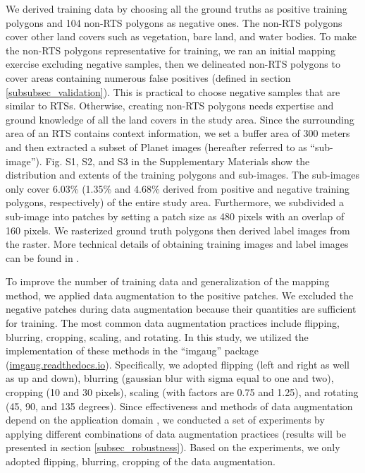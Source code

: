 \documentclass[preprint,12pt,authoryear]{elsarticle}
\begin{document}
We derived training data by choosing all the ground truths as positive training polygons and 104 non-RTS polygons as negative ones. The non-RTS polygons cover other land covers such as vegetation, bare land, and water bodies. To make the non-RTS polygons representative for training, we ran an initial mapping exercise excluding negative samples, then we delineated non-RTS polygons to cover areas containing numerous false positives (defined in section \ref{subsubsec_validation}). This is practical to choose negative samples that are similar to RTSs. Otherwise, creating non-RTS polygons needs expertise and ground knowledge of all the land covers in the study area. Since the surrounding area of an RTS contains context information, we set a buffer area of 300 meters and then extracted a subset of Planet images (hereafter referred to as “sub-image”). Fig. S1, S2, and S3 in the Supplementary Materials show the distribution and extents of the training polygons and sub-images. The sub-images only cover 6.03\% (1.35\% and 4.68\% derived from positive and negative training polygons, respectively) of the entire study area. Furthermore, we subdivided a sub-image into patches by setting a patch size as 480 pixels with an overlap of 160 pixels. We rasterized ground truth polygons then derived label images from the raster. More technical details of obtaining training images and label images can be found in \cite{huang2018automatic}. 

To improve the number of training data and generalization of the mapping method, we applied data augmentation to the positive patches. We excluded the negative patches during data augmentation because their quantities are sufficient for training. The most common data augmentation practices include flipping, blurring, cropping, scaling, and rotating. In this study, we utilized the implementation of these methods in the “imgaug” package (\url{imgaug.readthedocs.io}). Specifically, we adopted flipping (left and right as well as up and down), blurring (gaussian blur with sigma equal to one and two), cropping (10 and 30 pixels), scaling (with factors are 0.75 and 1.25), and rotating (45, 90, and 135 degrees). Since effectiveness and methods of data augmentation depend on the application domain \citep{perez2017effectiveness}, we conducted a set of experiments by applying different combinations of data augmentation practices (results will be presented in section \ref{subsec_robustness}). Based on the experiments, we only adopted flipping, blurring, cropping of the data augmentation. 
\end{document}
